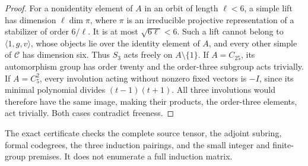 \begin{proof}
For a nonidentity element of $A$ in an orbit of length $\ell<6$, a
simple lift has dimension $\ell\dim\pi$, where $\pi$ is an irreducible
projective representation of a stabilizer of order $6/\ell$.
It is at most $\sqrt{6\ell}<6$. Such a lift cannot belong to
$\langle1,g,v\rangle$, whose objects lie over the identity element of
$A$, and every other simple of $\mathcal C$ has dimension six.
Thus $S_3$ acts freely on $A\setminus\{1\}$.
If $A=C_{25}$, its automorphism group has order twenty and the
order-three subgroup acts trivially. If $A=C_5^2$, every involution
acting without nonzero fixed vectors is $-I$, since its minimal
polynomial divides $(t-1)(t+1)$. All three involutions would therefore
have the same image, making their products, the order-three elements,
act trivially. Both cases contradict freeness.
\end{proof}

The exact certificate checks the complete source tensor, the adjoint
subring, formal codegrees, the three induction pairings, and the small
integer and finite-group premises. It does not enumerate a full
induction matrix.
